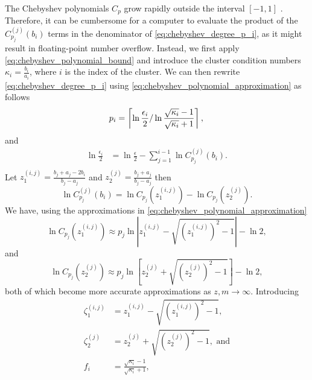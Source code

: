 The Chebyshev polynomials $C_p$ grow rapidly outside the interval $[-1,1]$ \cite[Section 4]{cg_sharpened_convrate_Axelsson1976}. Therefore, it can be cumbersome for a computer to evaluate the product of the $C^{(j)}_{p_j}(b_i)$ terms in the denominator of \cref{eq:chebyshev_degree_p_i}, as it might result in floating-point number overflow. Instead, we first apply \cref{eq:chebyshev_polynomial_bound} and introduce the cluster condition numbers $\kappa_i = \frac{b_i}{a_i}$, where $i$ is the index of the cluster. We can then rewrite \cref{eq:chebyshev_degree_p_i} using \cref{eq:chebyshev_polynomial_approximation} as follows
\begin{equation*}
    p_i  =  \left\lceil\ln{\frac{\epsilon_i}{2}} / \ln{\frac{\sqrt{\kappa_i} - 1}{\sqrt{\kappa_i} + 1}}\right\rceil, \\
\end{equation*}
and
\begin{align*}
    \ln{\frac{\epsilon_i}{2}} & = \ln{\frac{\epsilon}{2}} - \sum_{j=1}^{i-1} \ln{C^{(j)}_{p_j}(b_i)}. \\
\end{align*}
Let $z^{(i,j)}_1 = \frac{b_j + a_j - 2b_i}{b_j - a_j}$ and $z^{(j)}_2 = \frac{b_j + a_j}{b_j - a_j}$ then
\begin{equation*}
    \ln{C^{(j)}_{p_j}(b_i)} = \ln{C_{p_j}(z^{(i,j)}_1)} - \ln{C_{p_j}(z^{(j)}_2)}.
\end{equation*}
We have, using the approximations in \cref{eq:chebyshev_polynomial_approximation}
\begin{equation}
    \ln{C_{p_j}(z^{(i,j)}_1)} \approx p_j \ln{\left|z^{(i,j)}_1 - \sqrt{\left(z^{(i,j)}_1\right)^2 - 1}\right|} - \ln{2},
    \label{eq:chebyshev_polynomial_bound_z1}
\end{equation}
and
\begin{equation}
    \ln{C_{p_j}(z^{(j)}_2)} \approx p_j \ln{\left[z^{(j)}_2 + \sqrt{\left(z^{(j)}_2\right)^2 - 1}\right]} - \ln{2},
    \label{eq:chebyshev_polynomial_bound_z2}
\end{equation}
both of which become more accurate approximations as $z,m\rightarrow\infty$. Introducing
\begin{align*}
    \zeta^{(i,j)}_1 & = z^{(i,j)}_1 - \sqrt{\left(z^{(i,j)}_1\right)^2 - 1},         \\
    \zeta^{(j)}_2   & = z^{(j)}_2 + \sqrt{\left(z^{(j)}_2\right)^2 - 1}, \text{ and} \\
    f_i             & = \frac{\sqrt{\kappa_i} - 1}{\sqrt{\kappa_i} + 1},
\end{align*}
